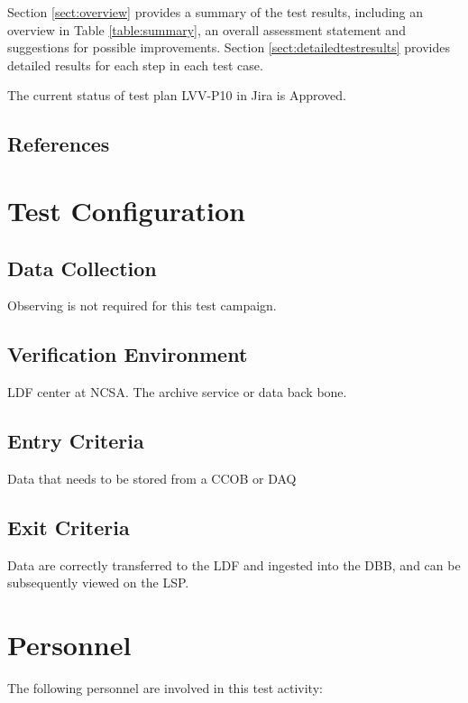 \documentclass[DM,lsstdraft,STR,toc]{lsstdoc}
\begin{document}
Section \ref{sect:overview} provides a summary of the test results, including an overview in Table \ref{table:summary}, an overall assessment statement and suggestions for possible improvements.
Section \ref{sect:detailedtestresults} provides detailed results for each step in each test case.

The current status of test plan LVV-P10 in Jira is Approved.

\subsection{References}
\label{sect:references}
\renewcommand{\refname}{}

\section{Test Configuration}
\label{sect:configuration}

\subsection{Data Collection}

  Observing is not required for this test campaign.

\subsection{Verification Environment}
\label{sect:hwconf}
  LDF center at NCSA. The archive service or data back bone.


  \subsection{Entry Criteria}
  Data that needs to be stored from a CCOB or DAQ


  \subsection{Exit Criteria}
  Data are correctly transferred to the LDF and ingested into the DBB, and
can be subsequently viewed on the LSP.



\section{Personnel}
\label{sect:personnel}

The following personnel are involved in this test activity:
\end{document}
